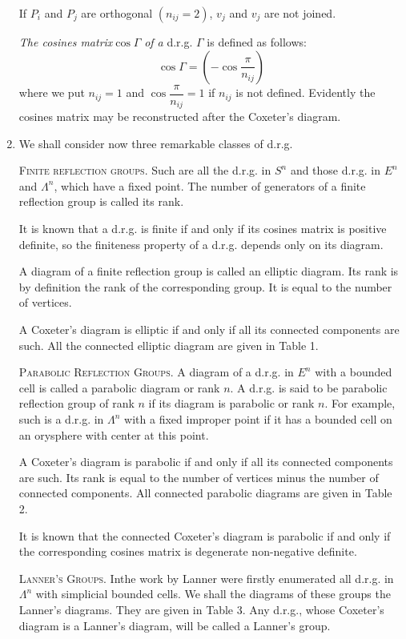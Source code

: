 \begin{enumerate}
If $P_i$ and $P_j$ are orthogonal $(n_{ij} =2)$, $v_j$ and $v_j$  are not joined. 

\textit{The cosines matrix}\pageoriginale $\cos \Gamma$ \textit{of a} d.r.g. $\Gamma$ is defined as follows:
$$
\cos \Gamma = \left(-\cos \frac{\pi}{n_{ij}} \right)
$$
where we put $n_{ij} =1$ and $\cos \dfrac{\pi}{n_{ij}} =1$ if $n_{ij}$ is not defined. Evidently the cosines matrix may be reconstructed after the Coxeter's diagram. 

\item We shall consider now three remarkable classes of d.r.g.

\textsc{Finite reflection groups.} Such are all the d.r.g. in $S^n$ and those d.r.g. in $E^n$ and $\Lambda^n$, which have a fixed point. The number of generators of a finite reflection group is called its rank.

It is known \cite{art10-key1} that a d.r.g. is finite if and only if its cosines matrix is positive definite, so the finiteness property of a d.r.g. depends only on its diagram. 

A diagram of a finite reflection group is called an elliptic diagram. Its rank is by definition the rank of the corresponding group. It is equal to the number of vertices.

A Coxeter's diagram is elliptic if and  only if all its connected components are such. All the connected elliptic diagram are given in Table 1.

\medskip
\noindent
\textsc{Parabolic Reflection Groups.} A diagram of a d.r.g. in $E^n$ with a bounded cell is called a parabolic diagram or rank $n$. A d.r.g. is said to be parabolic reflection group of rank $n$ if its diagram is parabolic or rank $n$. For example, such is a d.r.g. in $\Lambda^n$ with a fixed improper point if it has a bounded cell on an orysphere with center at this point.

A Coxeter's diagram is parabolic if and only if all its connected components are such. Its rank is equal to the number of vertices minus the number of connected components. All connected parabolic diagrams are  given in Table 2.

It is known \cite{art10-key1} that the connected Coxeter's diagram is parabolic if and only if the corresponding cosines matrix is degenerate non-negative definite.

\medskip
\noindent
\textsc{Lanner's Groups.} In\pageoriginale the work \cite{art10-key3} by Lanner were firstly enumerated all d.r.g. in $\Lambda^n$ with simplicial bounded cells. We shall the diagrams of these groups the Lanner's diagrams. They are given in Table 3. Any d.r.g., whose Coxeter's diagram is a Lanner's diagram, will be called a Lanner's group. 


\end{enumerate}
